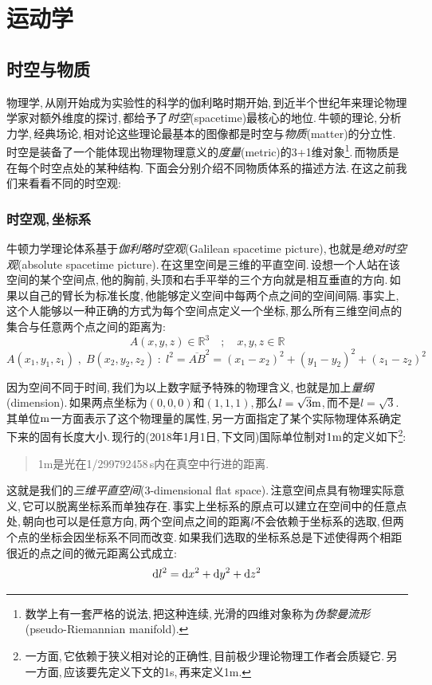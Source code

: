 \chapter{运动学}


\section{时空与物质}

物理学,\,从刚开始成为实验性的科学的伽利略时期开始,\,到近半个世纪年来理论物理学家对额外维度的探讨,\,都给予了\emph{时空}(spacetime)最核心的地位.\,牛顿的理论,\,分析力学,\,经典场论,\,相对论这些理论最基本的图像都是时空与\emph{物质}(matter)的分立性.\,时空是装备了一个能体现出物理物理意义的\emph{度量}(metric)的3+1维对象\footnote{数学上有一套严格的说法,\,把这种连续,\,光滑的四维对象称为\emph{伪黎曼流形}(pseudo-Riemannian manifold).}.\,而物质是在每个时空点处的某种结构.\,下面会分别介绍不同物质体系的描述方法.\,在这之前我们来看看不同的时空观:

\subsection{时空观,\,坐标系}
牛顿力学理论体系基于\emph{伽利略时空观}(Galilean spacetime picture),\,也就是\emph{绝对时空观}(absolute spacetime picture).\,在这里空间是三维的平直空间.\,设想一个人站在该空间的某个空间点,\,他的胸前,\,头顶和右手平举的三个方向就是相互垂直的方向.\,如果以自己的臂长为标准长度,\,他能够定义空间中每两个点之间的空间间隔.\,事实上,\,这个人能够以一种正确的方式为每个空间点定义一个坐标,\,那么所有三维空间点的集合与任意两个点之间的距离为:
\[A(x,y,z)\in\mathbb{R}^3 \quad;\quad x,y,z\in\mathbb{R}\]
\[A(x_1,y_1,z_1)\;,\;B(x_2,y_2,z_2)\;:\;l^2=\overline{AB}^2=(x_1-x_2)^2+(y_1-y_2)^2+(z_1-z_2)^2\]

因为空间不同于时间,\,我们为以上数字赋予特殊的物理含义,\,也就是加上\emph{量纲}(dimension).\,如果两点坐标为$(0,0,0)$和$(1,1,1)$,\,那么$l=\sqrt{3}{\rm m}$,\,而不是$l=\sqrt{3}$.\,其单位${\rm m}$一方面表示了这个物理量的属性,\,另一方面指定了某个实际物理体系确定下来的固有长度大小.\,现行的(2018年1月1日,\,下文同)国际单位制对$1{\rm m}$的定义如下\footnote{一方面,\,它依赖于狭义相对论的正确性,\,目前极少理论物理工作者会质疑它.\,另一方面,\,应该要先定义下文的1s,\,再来定义1m.}:
\begin{verse}
1m是光在1/299792458\,s内在真空中行进的距离.
\end{verse}


这就是我们的\emph{三维平直空间}(3-dimensional flat space).\,注意空间点具有物理实际意义,\,它可以脱离坐标系而单独存在.\,事实上坐标系的原点可以建立在空间中的任意点处,\,朝向也可以是任意方向,\,两个空间点之间的距离$l$不会依赖于坐标系的选取,\,但两个点的坐标会因坐标系不同而改变.\,如果我们选取的坐标系总是下述使得两个相距很近的点之间的微元距离公式成立:
\[\textrm{d} l^2=\textrm{d} x^2+\textrm{d} y^2+\textrm{d} z^2\]


